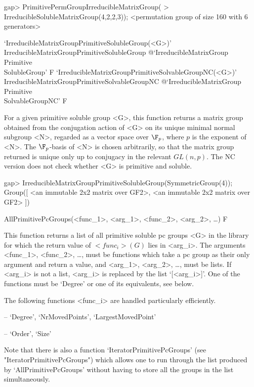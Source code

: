 \beginexample
gap> PrimitivePermGroupIrreducibleMatrixGroup(
>       IrreducibleSolubleMatrixGroup(4,2,2,3));
<permutation group of size 160 with 6 generators>
\endexample

\>`IrreducibleMatrixGroupPrimitiveSolubleGroup(<G>)'%
{IrreducibleMatrixGroupPrimitiveSolubleGroup}%
@{`IrreducibleMatrixGroup\\Primitive\\SolubleGroup'} F
\>`IrreducibleMatrixGroupPrimitiveSolvableGroupNC(<G>)'%
{IrreducibleMatrixGroupPrimitiveSolvableGroupNC}%
@{`IrreducibleMatrixGroup\\Primitive\\SolvableGroupNC'} F

For a given primitive soluble group <G>, this function returns a matrix group 
obtained from the conjugation
action of <G> on its unique minimal normal subgroup <N>, regarded as a vector 
space over $\F_p$, where $p$ is the exponent of <N>. 
The $\F_p$-basis of <N> is chosen arbitrarily, so that the matrix group returned 
is unique only up to conjugacy in the relevant $GL(n, p)$. The NC version does
not check whether <G> is primitive and soluble.

\beginexample
gap> IrreducibleMatrixGroupPrimitiveSolubleGroup(SymmetricGroup(4));
Group([ <an immutable 2x2 matrix over GF2>, 
  <an immutable 2x2 matrix over GF2> ])
\endexample


\>AllPrimitivePcGroups(<func_1>, <arg_1>, <func_2>, <arg_2>, \dots) F

This function returns a list of all primitive soluble pc
groups <G> in the  {\IRREDSOL} library for which the return value of $<func_i>(G)$ lies
in <arg_i>.  The arguments <func_1>, <func_2>, \dots,
must be {\GAP} functions which take a pc group as their only argument and return a
value, and <arg_1>, <arg_2>,
\dots,  must be lists. If <arg_i> is not a list, <arg_i> is replaced by the list
`[<arg_i>]'. One of the functions must be `Degree' or one of its
equivalents, see below.

The following functions <func_i> are handled particularly efficiently.

\beginlist
\item{--} `Degree', `NrMovedPoints', `LargestMovedPoint'
\item{--} `Order', `Size'
\endlist

Note that there is also a function `IteratorPrimitivePcGroups' (see
"IteratorPrimitivePcGroups") which allows one to run through the list produced by
`AllPrimitivePcGroups' without having to store all the groups in the list
simultaneously.


